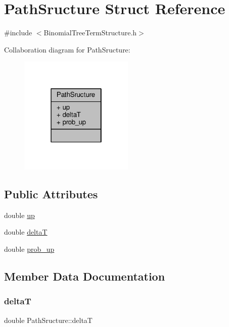 \hypertarget{structPathSructure}{}\section{Path\+Sructure Struct Reference}
\label{structPathSructure}


{\ttfamily \#include $<$Binomial\+Tree\+Term\+Structure.\+h$>$}



Collaboration diagram for Path\+Sructure\+:
\nopagebreak
\begin{figure}[H]
\begin{center}
\leavevmode
\includegraphics[width=154pt]{structPathSructure__coll__graph}
\end{center}
\end{figure}
\subsection*{Public Attributes}
\begin{DoxyCompactItemize}
\item 
double \hyperlink{structPathSructure_aca3d1c12b68ccb0d07a0e2abc6f4289f}{up}
\item 
double \hyperlink{structPathSructure_a0b6f6866894d7b1a5a3cf7952187c8f9}{deltaT}
\item 
double \hyperlink{structPathSructure_ac2c24fe1ce2620e12509b75ccfae96bc}{prob\+\_\+up}
\end{DoxyCompactItemize}


\subsection{Member Data Documentation}
\hypertarget{structPathSructure_a0b6f6866894d7b1a5a3cf7952187c8f9}{}\label{structPathSructure_a0b6f6866894d7b1a5a3cf7952187c8f9} 
\subsubsection{\texorpdfstring{deltaT}{deltaT}}
{\footnotesize\ttfamily double Path\+Sructure\+::deltaT}


